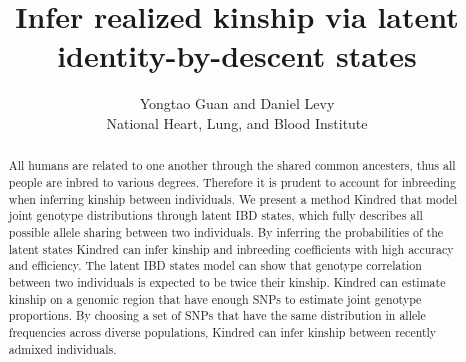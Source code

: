 \documentclass[11pt,Times]{article}
\begin{document}




\title{Infer realized kinship via latent identity-by-descent states}

\author{Yongtao Guan and Daniel Levy \protect\\  National Heart, Lung, and Blood Institute}
\date{}
\maketitle




\def\e{{\mathbf{\epsilon}}}
\def\u{{\mathbf{u}}}
\def\x{{\mathbf{x}}}
\def\X{{\mathbf{X}}}
\def\g{{\mathbf{g}}}
\def\al{{\mathbf{\alpha}}}
\def\ga{{\mathbf{\gamma}}}
\def\y{{\mathbf{y}}}
\def\bb{{\mathbf{\beta}}}
\def\a{{\mathbf{a}}}
\def\z{{\mathbf{z}}}
\def\Z{{\mathbf{Z}}}
\def\W{{\mathbf{W}}}
\def\Q{{\mathbf{Q}}}
\def\U{{\mathbf{U}}}
\def\D{{\mathbf{D}}}
\def\K{{\mathbf{K}}}
\def\S{{\mathbf{S}}}

\begin{abstract}
All humans are related to one another through the shared common ancesters, thus all people are inbred to various degrees. Therefore it is prudent to account for inbreeding when inferring kinship between individuals. We present a method Kindred that model joint genotype distributions through latent IBD states, which fully describes all possible allele sharing between two individuals. By inferring the probabilities of the latent states Kindred can infer kinship and inbreeding coefficients with high accuracy and efficiency. The latent IBD states model can show that genotype correlation between two individuals is expected to be twice their kinship. Kindred can estimate kinship on a genomic region that have enough SNPs to estimate joint genotype proportions. By choosing a set of SNPs that have the same distribution in allele frequencies across diverse populations, Kindred can infer kinship between recently admixed individuals.   
\end{abstract}
\end{document}
